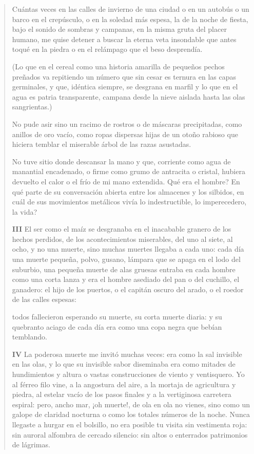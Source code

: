 \documentclass[12pt]{article}
\begin{document}
\begin{verse}
Cuántas veces en las calles de invierno de una ciudad o en  
un autobús o un barco en el crepúsculo, o en la soledad  
más espesa, la de la noche de fiesta, bajo el sonido  
de sombras y campanas, en la misma gruta del placer humano,  
me quise detener a buscar la eterna veta insondable  
que antes toqué en la piedra o en el relámpago que el beso desprendía.  
	
(Lo que en el cereal como una historia amarilla  
de pequeños pechos preñados va repitiendo un número  
que sin cesar es ternura en las capas germinales,  
y que, idéntica siempre, se desgrana en marfil  
y lo que en el agua es patria transparente, campana  
desde la nieve aislada hasta las olas sangrientas.)  
	
No pude asir sino un racimo de rostros o de máscaras  
precipitadas, como anillos de oro vacío,  
como ropas dispersas hijas de un otoño rabioso  
que hiciera temblar el miserable árbol de las razas asustadas.  
	
No tuve sitio donde descansar la mano  
y que, corriente como agua de manantial encadenado,  
o firme como grumo de antracita o cristal,  
hubiera devuelto el calor o el frío de mi mano extendida.  
Qué era el hombre? En qué parte de su conversación abierta  
entre los almacenes y los silbidos, en cuál de sus movimientos metálicos  
vivía lo indestructible, lo imperecedero, la vida?  

\vspace{\baselineskip}
{\scshape\bfseries III}
El ser como el maíz se desgranaba en el inacabable  
granero de los hechos perdidos, de los acontecimientos  
miserables, del uno al siete, al ocho,  
y no una muerte, sino muchas muertes llegaba a cada uno:  
cada día una muerte pequeña, polvo, gusano, lámpara  
que se apaga en el lodo del suburbio, una pequeña muerte de alas gruesas  
entraba en cada hombre como una corta lanza  
y era el hombre asediado del pan o del cuchillo,  
el ganadero: el hijo de los puertos, o el capitán oscuro del arado,  
o el roedor de las calles espesas:  
	
todos fallecieron esperando su muerte, su corta muerte diaria:  
y su quebranto aciago de cada día era  
como una copa negra que bebían temblando.  

\vspace{\baselineskip}
{\scshape\bfseries IV}
La poderosa muerte me invitó muchas veces:  
era como la sal invisible en las olas,  
y lo que su invisible sabor diseminaba  
era como mitades de hundimientos y altura  
o vastas construcciones de viento y ventisquero.  
Yo al férreo filo vine, a la angostura  
del aire, a la mortaja de agricultura y piedra,  
al estelar vacío de los pasos finales  
y a la vertiginosa carretera espiral:  
pero, ancho mar, ¡oh muerte!, de ola en ola no vienes,  
sino como un galope de claridad nocturna  
o como los totales números de la noche.  
Nunca llegaste a hurgar en el bolsillo, no era  
posible tu visita sin vestimenta roja:  
sin auroral alfombra de cercado silencio:  
sin altos o enterrados patrimonios de lágrimas.  
	

\end{verse}
\end{document}
